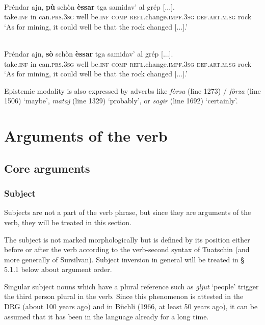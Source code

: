 \ea
\label{ex:pudsav1}
\\
\gll Préndar ajn, \textbf{pù} schòn \textbf{èssar} tga samidav’ al grép [...].\\
take.\textsc{inf} in can.\textsc{prs.3sg} well be.\textsc{inf}  \textsc{comp} \textsc{refl}.change.\textsc{impf.3sg} \textsc{def.art.m.sg} rock\\
\glt `As for mining, it could well be that the rock changed [...].'
\z

\ea
\label{ex:pudsav2}
\\
\gll Préndar ajn, \textbf{sò} schòn \textbf{èssar} tga samidav’ al grép [...].\\
take.\textsc{inf} in can.\textsc{prs.3sg} well be.\textsc{inf}  \textsc{comp} \textsc{refl}.change.\textsc{impf.3sg} \textsc{def.art.m.sg} rock\\
\glt `As for mining, it could well be that the rock changed [...].'
\z

Epistemic modality is also expressed by adverbs like \textit{fòrsa} (line 1273) / \textit{fòrza} (line 1506) `maybe', \textit{mataj} (line 1329) `probably', or \textit{sagir} (line 1692) `certainly'.


\section{Arguments of the verb} 

\subsection{Core arguments}

\subsubsection{Subject}
Subjects are not a part of the verb phrase, but since they are arguments of the verb, they will be treated in this section.

The subject is not marked morphologically but is defined by its position either before or after the verb according to the verb-second syntax of Tuatschin (and more generally of Sursilvan). Subject inversion in general will be treated in § 5.1.1 below about argument order.

Singular subject nouns which have a plural reference such as \textit{gljut} `people' trigger the third person plural in the verb. Since this phenomenon is attested in the DRG (about 100 years ago) and in Büchli (1966, at least 50 years ago), it can be assumed that it has been in the language already for a long time.

